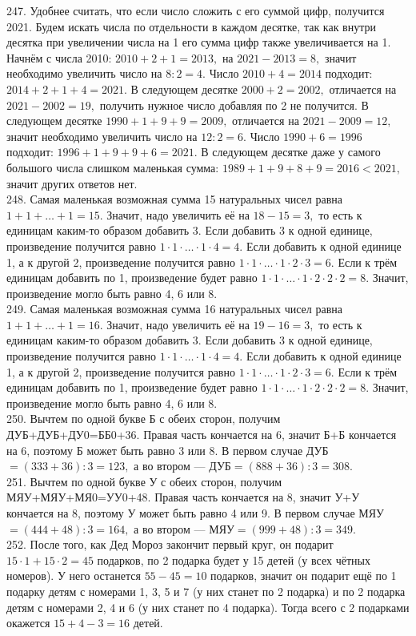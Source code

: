 \documentclass[12pt]{article}
\begin{document}
247. Удобнее считать, что если число сложить с его суммой цифр, получится 2021. Будем искать числа по отдельности в каждом десятке, так как внутри десятка при увеличении числа на 1 его сумма цифр также увеличивается на 1. Начнём с числа 2010: $2010+2+1=2013,$ на $2021-2013=8,$ значит необходимо увеличить число на $8:2=4.$ Число $2010+4=2014$ подходит: $2014+2+1+4=2021.$ В следующем десятке $2000+2=2002,$ отличается на $2021-2002=19,$ получить нужное число добавляя по 2 не получится. В следующем десятке $1990+1+9+9=2009,$ отличается на $2021-2009=12,$ значит необходимо увеличить число на $12:2=6.$ Число $1990+6=1996$ подходит: $1996+1+9+9+6=2021.$ В следующем десятке даже у самого большого числа слишком маленькая сумма: $1989+1+9+8+9=2016<2021,$ значит других ответов нет.\\
248. Самая маленькая возможная сумма 15 натуральных чисел равна $1+1+\ldots+1=15.$ Значит, надо увеличить её на $18-15=3,$ то есть к единицам каким-то образом добавить 3. Если добавить 3 к одной единице, произведение получится равно $1\cdot1\cdot\ldots\cdot1\cdot4=4.$ Если добавить к одной единице 1, а к другой 2, произведение получится равно $1\cdot1\cdot\ldots\cdot1\cdot2\cdot3=6.$ Если к трём единицам добавить по 1, произведение будет равно $1\cdot1\cdot\ldots\cdot1\cdot2\cdot2\cdot2=8.$ Значит, произведение могло быть равно 4, 6 или 8.\\
249. Самая маленькая возможная сумма 16 натуральных чисел равна $1+1+\ldots+1=16.$ Значит, надо увеличить её на $19-16=3,$ то есть к единицам каким-то образом добавить 3. Если добавить 3 к одной единице, произведение получится равно $1\cdot1\cdot\ldots\cdot1\cdot4=4.$ Если добавить к одной единице 1, а к другой 2, произведение получится равно $1\cdot1\cdot\ldots\cdot1\cdot2\cdot3=6.$ Если к трём единицам добавить по 1, произведение будет равно $1\cdot1\cdot\ldots\cdot1\cdot2\cdot2\cdot2=8.$ Значит, произведение могло быть равно 4, 6 или 8.\\
250. Вычтем по одной букве Б с обеих сторон, получим ДУБ+ДУБ+ДУ0=ББ0+36. Правая часть кончается на 6, значит Б+Б кончается на 6, поэтому Б может быть равно 3 или 8. В первом случае ДУБ$=(333+36):3=123,$ а во втором --- ДУБ$=(888+36):3=308.$\\
251. Вычтем по одной букве У с обеих сторон, получим МЯУ+МЯУ+МЯ0=УУ0+48. Правая часть кончается на 8, значит У+У кончается на 8, поэтому У может быть равно 4 или 9. В первом случае МЯУ$=(444+48):3=164,$ а во втором --- МЯУ$=(999+48):3=349.$\\
252. После того, как Дед Мороз закончит первый круг, он подарит $15\cdot1+15\cdot2=45$ подарков, по 2 подарка будет у 15 детей (у всех чётных номеров). У него останется $55-45=10$ подарков, значит он подарит ещё по 1 подарку детям с номерами 1, 3, 5 и 7 (у них станет по 2 подарка) и по 2 подарка детям с номерами 2, 4 и 6 (у них станет по 4 подарка). Тогда всего с 2 подарками окажется $15+4-3=16$ детей.\\
\end{document}
